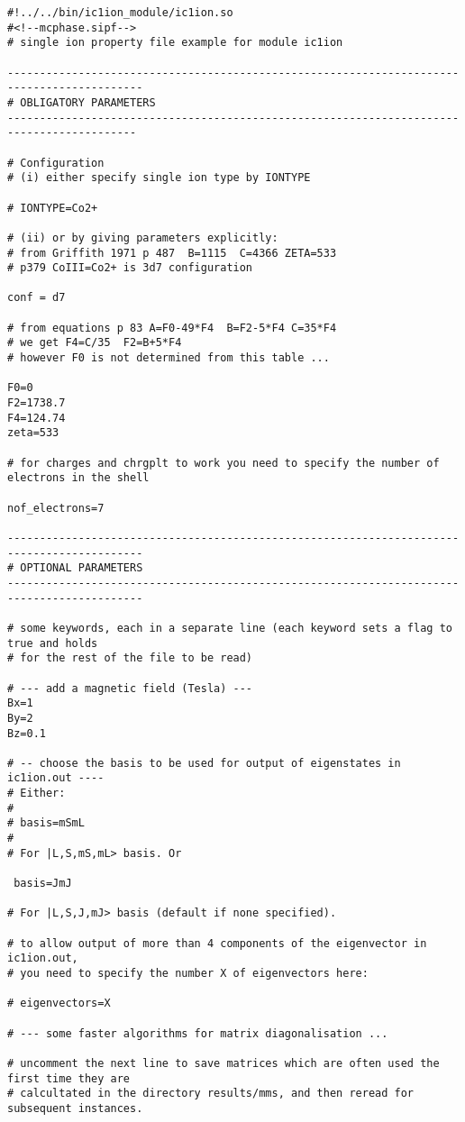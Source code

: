 {\footnotesize
\begin{verbatim}
#!../../bin/ic1ion_module/ic1ion.so
#<!--mcphase.sipf-->
# single ion property file example for module ic1ion

-------------------------------------------------------------------------------------------
# OBLIGATORY PARAMETERS
------------------------------------------------------------------------------------------

# Configuration
# (i) either specify single ion type by IONTYPE 

# IONTYPE=Co2+

# (ii) or by giving parameters explicitly:
# from Griffith 1971 p 487  B=1115  C=4366 ZETA=533
# p379 CoIII=Co2+ is 3d7 configuration

conf = d7

# from equations p 83 A=F0-49*F4  B=F2-5*F4 C=35*F4
# we get F4=C/35  F2=B+5*F4
# however F0 is not determined from this table ...

F0=0
F2=1738.7
F4=124.74
zeta=533

# for charges and chrgplt to work you need to specify the number of electrons in the shell

nof_electrons=7

-------------------------------------------------------------------------------------------
# OPTIONAL PARAMETERS
-------------------------------------------------------------------------------------------

# some keywords, each in a separate line (each keyword sets a flag to true and holds
# for the rest of the file to be read)

# --- add a magnetic field (Tesla) ---
Bx=1
By=2
Bz=0.1

# -- choose the basis to be used for output of eigenstates in ic1ion.out ----
# Either:
#
# basis=mSmL
#
# For |L,S,mS,mL> basis. Or
 
 basis=JmJ

# For |L,S,J,mJ> basis (default if none specified).

# to allow output of more than 4 components of the eigenvector in ic1ion.out, 
# you need to specify the number X of eigenvectors here:

# eigenvectors=X

# --- some faster algorithms for matrix diagonalisation ...

# uncomment the next line to save matrices which are often used the first time they are
# calcultated in the directory results/mms, and then reread for subsequent instances.


\end{verbatim}}
